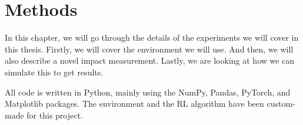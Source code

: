 \documentclass[12pt,A4]{report}
\theoremstyle{definition}
\begin{document}







\chapter{Methods}
In this chapter, we will go through the details of the experiments we will cover in this thesis. Firstly, we will cover the environment we will use. And then, we will also describe a novel impact measurement. Lastly, we are looking at how we can simulate this to get results.

All code is written in Python, mainly using the NumPy, Pandas, PyTorch, and Matplotlib packages. The environment and the RL algorithm have been custom-made for this project.
\end{document}
